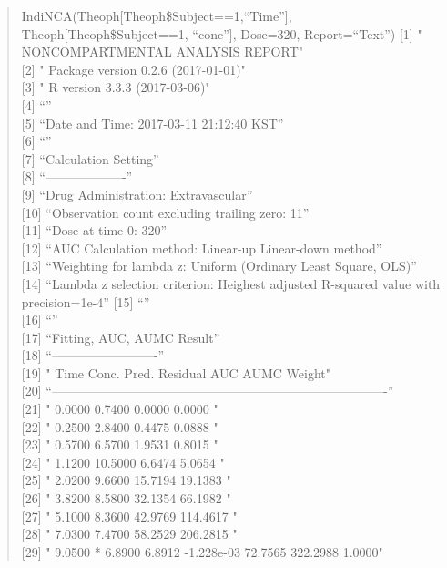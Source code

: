 \documentclass[12pt,]{krantz}
\theoremstyle{definition}
\theoremstyle{definition}
\theoremstyle{definition}
\theoremstyle{remark}
\begin{document}
\begin{quote}
IndiNCA(Theoph{[}Theoph\$Subject==1,``Time''{]},
Theoph{[}Theoph\$Subject==1, ``conc''{]}, Dose=320, Report=``Text'')
{[}1{]} " NONCOMPARTMENTAL ANALYSIS REPORT"\\
{[}2{]} " Package version 0.2.6 (2017-01-01)"\\
{[}3{]} " R version 3.3.3 (2017-03-06)"\\
{[}4{]} ``''\\
{[}5{]} ``Date and Time: 2017-03-11 21:12:40 KST''\\
{[}6{]} ``''\\
{[}7{]} ``Calculation Setting''\\
{[}8{]} ``-------------------''\\
{[}9{]} ``Drug Administration: Extravascular''\\
{[}10{]} ``Observation count excluding trailing zero: 11''\\
{[}11{]} ``Dose at time 0: 320''\\
{[}12{]} ``AUC Calculation method: Linear-up Linear-down method''\\
{[}13{]} ``Weighting for lambda z: Uniform (Ordinary Least Square,
OLS)''\\
{[}14{]} ``Lambda z selection criterion: Heighest adjusted R-squared
value with precision=1e-4'' {[}15{]} ``''\\
{[}16{]} ``''\\
{[}17{]} ``Fitting, AUC, AUMC Result''\\
{[}18{]} ``-------------------------''\\
{[}19{]} " Time Conc. Pred. Residual AUC AUMC Weight"\\
{[}20{]}
``-------------------------------------------------------------------------------''\\
{[}21{]} " 0.0000 0.7400 0.0000 0.0000 "\\
{[}22{]} " 0.2500 2.8400 0.4475 0.0888 "\\
{[}23{]} " 0.5700 6.5700 1.9531 0.8015 "\\
{[}24{]} " 1.1200 10.5000 6.6474 5.0654 "\\
{[}25{]} " 2.0200 9.6600 15.7194 19.1383 "\\
{[}26{]} " 3.8200 8.5800 32.1354 66.1982 "\\
{[}27{]} " 5.1000 8.3600 42.9769 114.4617 "\\
{[}28{]} " 7.0300 7.4700 58.2529 206.2815 "\\
{[}29{]} " 9.0500 * 6.8900 6.8912 -1.228e-03 72.7565 322.2988 1.0000"\\

\end{quote}
\end{document}
